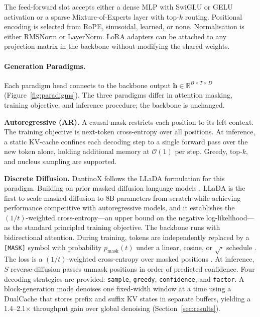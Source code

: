 The feed-forward slot accepts either a dense MLP with SwiGLU or GELU activation
or a sparse Mixture-of-Experts layer \citep{fedus-etal-2022-switch} with top-$k$
routing.
Positional encoding is selected from RoPE, sinusoidal, learned, or none.
Normalisation is either RMSNorm or LayerNorm.
LoRA adapters \citep{hu-etal-2022-lora} can be attached to any projection
matrix in the backbone without modifying the shared weights.

\paragraph{Generation Paradigms.}
Each paradigm head connects to the backbone output
$\mathbf{h} \in \mathbb{R}^{B \times T \times D}$
(Figure~\ref{fig:paradigms}).
The three paradigms differ in attention masking, training objective, and
inference procedure; the backbone is unchanged.

\noindent\textbf{Autoregressive (AR).}
A causal mask restricts each position to its left context.
The training objective is next-token cross-entropy over all positions.
At inference, a static KV-cache confines each decoding step to a single forward
pass over the new token alone, holding additional memory at $\mathcal{O}(1)$
per step.
Greedy, top-$k$, and nucleus sampling are supported.

\noindent\textbf{Discrete Diffusion.}
DantinoX follows the LLaDA formulation \citep{nie-etal-2024-llada} for this
paradigm.
Building on prior masked diffusion language models
\citep{austin-etal-2021-structured,lou-etal-2023-discrete,sahoo-etal-2024-mdlm},
LLaDA is the first to scale masked diffusion to 8B parameters from scratch while
achieving performance competitive with autoregressive models, and it establishes the
$(1/t)$-weighted cross-entropy—an upper bound on the negative log-likelihood—as the
standard principled training objective.
The backbone runs with bidirectional attention.
During training, tokens are independently replaced by a \texttt{[MASK]} symbol
with probability $p_\mathrm{mask}(t)$ under a linear, cosine, or $\sqrt{\cdot}$
schedule \citep{austin-etal-2021-structured}.
The loss is a $(1/t)$-weighted cross-entropy over masked positions
\citep{nie-etal-2024-llada}.
At inference, $S$ reverse-diffusion passes unmask positions in order of
predicted confidence.
Four decoding strategies are provided: \texttt{sample}, \texttt{greedy},
\texttt{confidence}, and \texttt{factor}.
A block-generation mode denoises one fixed-width window at a time using a
DualCache that stores prefix and suffix KV states in separate buffers,
yielding a 1.4--2.1$\times$ throughput gain over global denoising
(Section~\ref{sec:results}).

